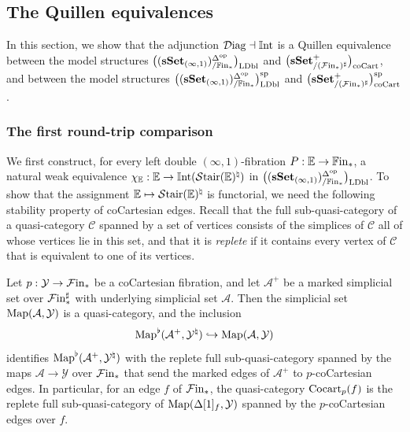 \documentclass[10pt,reqno]{amsart}
\begin{document}
\subsection{The Quillen equivalences}
\label{subsec:comparison_quillen_equivalences}

In this section, we show that the adjunction $\mathcal{D}\mathrm{iag}\dashv\mathbb{I}\mathrm{nt}$ is a
Quillen equivalence between the model structures $\bigl((\mathbf{sSet}_{(\infty,1)})^{\Delta^{\mathrm{op}}}_{/\mathbb{F}\mathrm{in}_*}\bigr)_{\mathrm{LDbl}}$ and
$\bigl(\mathbf{sSet}^+_{/(\mathcal{F}\mathrm{in}_*)^\sharp}\bigr)_{\mathrm{coCart}}$, and between the model structures $\bigl((\mathbf{sSet}_{(\infty,1)})^{\Delta^{\mathrm{op}}}_{/\mathbb{F}\mathrm{in}_*}\bigr)_{\mathrm{LDbl}}^{\mathrm{sp}}$ and
$\bigl(\mathbf{sSet}^+_{/(\mathcal{F}\mathrm{in}_*)^\sharp}\bigr)_{\mathrm{coCart}}^{\mathrm{sp}}$.

\subsubsection{The first round-trip comparison}
\label{subsubsec:first_roundtrip}

We first construct, for every left double $(\infty,1)$-fibration
$P:\mathbb E\to\mathbb{F}\mathrm{in}_*$, a natural weak equivalence
$\chi_{\mathbb E}:\mathbb E\to\mathbb{I}\mathrm{nt}(\mathcal{S}\mathrm{tair}(\mathbb E)^\natural)$ in
$\bigl((\mathbf{sSet}_{(\infty,1)})^{\Delta^{\mathrm{op}}}_{/\mathbb{F}\mathrm{in}_*}\bigr)_{\mathrm{LDbl}}$. To show that the assignment
$\mathbb E\mapsto\mathcal{S}\mathrm{tair}(\mathbb E)^\natural$ is functorial, we need
the following stability property of coCartesian edges. Recall that the
full sub-quasi-category of a quasi-category $\mathcal C$ spanned by
a set of vertices consists of the simplices of $\mathcal C$ all of
whose vertices lie in this set, and that it is \emph{replete} if it
contains every vertex of $\mathcal C$ that is equivalent to one of
its vertices.

\begin{lemma}
\label{lem:cocartesian_edges_replete}
Let $p:\mathcal Y\to \mathcal{F}\mathrm{in}_*$ be a coCartesian fibration, and let
$\mathcal A^+$ be a marked simplicial set over $\mathcal{F}\mathrm{in}_*^\sharp$
with underlying simplicial set $\mathcal A$. Then the simplicial set
$\operatorname{Map}(\mathcal A,\mathcal Y)$ is a quasi-category, and the inclusion
\[
 \operatorname{Map}^\flat(\mathcal A^+,\mathcal Y^\natural)
 \hookrightarrow \operatorname{Map}(\mathcal A,\mathcal Y)
\]
identifies $\operatorname{Map}^\flat(\mathcal A^+,\mathcal Y^\natural)$ with the
replete full sub-quasi-category spanned by the maps
$\mathcal A\to\mathcal Y$ over $\mathcal{F}\mathrm{in}_*$ that send the marked edges
of $\mathcal A^+$ to $p$-coCartesian edges. In particular, for an
edge $f$ of $\mathcal{F}\mathrm{in}_*$, the quasi-category $\operatorname{Cocart}_p(f)$ is the
replete full sub-quasi-category of $\operatorname{Map}(\Delta[1]_f,\mathcal Y)$
spanned by the $p$-coCartesian edges over $f$.
\end{lemma}
\end{document}
